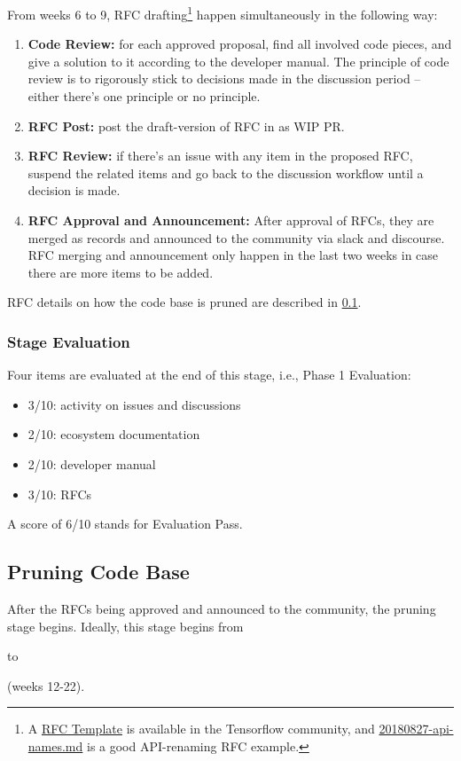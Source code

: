 From weeks 6 to 9, RFC drafting\footnote{A \href{https://github.com/tensorflow/community/blob/master/rfcs/yyyymmdd-rfc-template.md}{RFC Template} is available in the Tensorflow community, and \href{https://github.com/tensorflow/community/blob/master/rfcs/20180827-api-names.md}{20180827-api-names.md} is a good API-renaming RFC example.} happen simultaneously in the following way:
\begin{enumerate}
    \item \textbf{Code Review:} for each approved proposal, find all involved code pieces, and give a solution to it according to the developer manual. The principle of code review is to rigorously stick to decisions made in the discussion period -- either there's one principle or no principle.
    \item \textbf{RFC Post:} post the draft-version of RFC in \repoimagesgithubio{} as WIP PR.
    \item \textbf{RFC Review:} if there's an issue with any item in the proposed RFC, suspend the related items and go back to the discussion workflow until a decision is made.
    \item \textbf{RFC Approval and Announcement:} After approval of RFCs, they are merged as records and announced to the community via slack and discourse. RFC merging and announcement only happen in the last two weeks in case there are more items to be added.
\end{enumerate}
RFC details on how the code base is pruned are described in \cref{subsec:prune}.

\subsubsection*{Stage Evaluation}

Four items are evaluated at the end of this stage, i.e., \textsf{Phase 1 Evaluation}:
{\small
\begin{itemize}
    \item 3/10: activity on issues and discussions
    \item 2/10: ecosystem documentation
    \item 2/10: developer manual
    \item 3/10: RFCs
\end{itemize}
}
A score of 6/10 stands for \textsf{Evaluation Pass}.

\newpage
\subsection{Pruning Code Base}\label{subsec:prune}
After the RFCs being approved and announced to the community, the pruning stage begins. Ideally, this stage begins from \date{July 1} to \date{August 26} (weeks 12-22).

